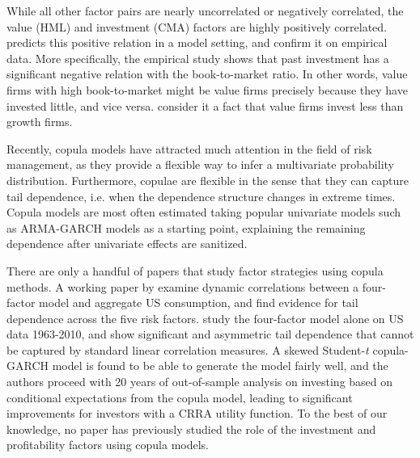While all other factor pairs are nearly uncorrelated or negatively correlated, the value (HML) and investment (CMA) factors are highly positively correlated. \textcite{Zhang2005} predicts this positive relation in a model setting, and \textcite{AndersonGarciaFeijoo2006} confirm it on empirical data. More specifically, the empirical study shows that past investment has a significant negative relation with the book-to-market ratio. In other words, value firms with high book-to-market might be value firms precisely because they have invested little, and vice versa. \textcite{FF2015} consider it a fact that value firms invest less than growth firms.

Recently, copula models have attracted much attention in the field of risk management, as they provide a flexible way to infer a multivariate probability distribution. Furthermore, copulae are flexible in the sense that they can capture tail dependence, i.e. when the dependence structure changes in extreme times. Copula models are most often estimated taking popular univariate models such as ARMA-GARCH models as a starting point, explaining the remaining dependence after univariate effects are sanitized. 

There are only a handful of papers that study factor strategies using copula methods. A working paper by \textcite{CholleteNing2012} examine dynamic correlations between a four-factor model and aggregate US consumption, and find evidence for tail dependence across the five risk factors. \textcite{ChristoffersenLanglois2013} study the four-factor model alone on US data 1963-2010, and show significant and asymmetric tail dependence that cannot be captured by standard linear correlation measures. A skewed Student-\textit{t} copula-GARCH model is found to be able to generate the model fairly well, and the authors proceed with 20 years of out-of-sample analysis on investing based on conditional expectations from the copula model, leading to significant improvements for investors with a CRRA utility function. To the best of our knowledge, no paper has previously studied the role of the investment and profitability factors using copula models.

